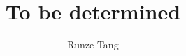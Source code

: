 \documentclass[12pt,oneside,final]{thesis}
\begin{document}
\title{To be determined}
\author{Runze Tang}
\dissertation
\doctorphilosophy
\copyrightnotice









%


%
%

\def\newblock{\hskip .11em plus.33em minus.07em}




\end{document}
